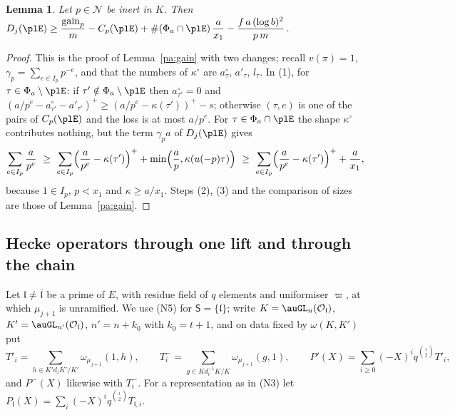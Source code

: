 \documentclass[10pt]{amsart}
\newtheorem{lemma}[theorem]{Lemma}
\theoremstyle{definition}
\theoremstyle{remark}
\providecommand{\auO}{\mathcal O}
\providecommand{\auPa}{\Phi_a}
\providecommand{\aubar}[1]{\overline{#1}}
\providecommand{\augain}{\operatorname{gain}}
\begin{document}
\begin{lemma}\label{pl:gain}
Let $p\in\mathcal N$ be inert in $K$. Then
$D_j(\plE)\ge\dfrac{\augain_p}m-C_p(\plE)+\#(\auPa\cap\plE)\,\dfrac a{x_1}-\dfrac{f\,a\,(\log b)^2}
{p\,m}$.
\end{lemma}
\begin{proof}
This is the proof of Lemma~\ref{pa:gain} with two changes; recall $v(\pi)=1$, $\gamma_p=\sum_{e\in
I_p}p^{-e}$, and that the numbers of $\kappa^\circ$ are $a^\circ_\tau$, $a'_\tau$, $l_\tau$. In
(1), for $\tau\in\auPa\setminus\plE$: if $\tau'\notin\auPa\setminus\plE$ then $a^\circ_{\tau'}=0$
and $(a/p^e-a^\circ_{\tau'}-a'_{\tau'})^+\ge(a/p^e-\kappa(\tau'))^+-s$; otherwise $(\tau,e)$ is one
of the pairs of $C_p(\plE)$ and the loss is at most $a/p^e$. For $\tau\in\auPa\cap\plE$ the shape
$\kappa^\circ$ contributes nothing, but the term $\gamma_pa$ of $D_j(\plE)$ gives
\[
\sum_{e\in I_p}\frac a{p^e}\ \ge\ \sum_{e\in I_p}\Bigl(\frac a{p^e}-\kappa(\tau')\Bigr)^++\min\Bigl(
\frac ap,\kappa(u(-p)\tau)\Bigr)\ \ge\ \sum_{e\in I_p}\Bigl(\frac a{p^e}-\kappa(\tau')\Bigr)^++\frac
a{x_1},
\]
because $1\in I_p$, $p<x_1$ and $\kappa\ge a/x_1$. Steps (2), (3) and the comparison of sizes are
those of Lemma~\ref{pa:gain}.
\end{proof}

\subsection{Hecke operators through one lift and through the chain}\label{pl:ss-transfer}
Let $\mathfrak l\ne\aubar{\mathfrak l}$ be a prime of $E$, with residue field of $q$ elements and
uniformiser $\varpi$, at which $\mu_{j+1}$ is unramified. We use (N5) for $\mathsf S=\{\mathfrak
l\}$; write $K=\auGL_n(\auO_{\mathfrak l})$, $K'=\auGL_{n'}(\auO_{\mathfrak l})$, $n'=n+k_0$ with
$k_0=t+1$, and on data fixed by $\omega(K,K')$ put
\[
T'_i=\sum_{h\in K'd_iK'/K'}\omega_{\mu_{j+1}}(1,h),\qquad T^-_i=\sum_{g\in Kd_i^{-1}K/K}
\omega_{\mu_{j+1}}(g,1),\qquad P'(X)=\sum_{i\ge0}(-X)^iq^{\binom i2}T'_i,
\]
and $P^-(X)$ likewise with $T^-_i$. For a representation as in (N3) let $P_{\mathfrak l}(X)=\sum_i
(-X)^iq^{\binom i2}T_{\mathfrak l,i}$.
\end{document}
